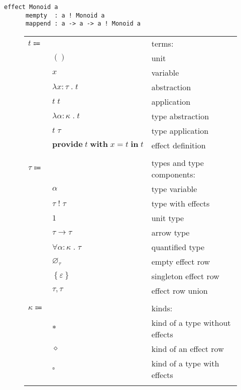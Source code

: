 \documentclass[12pt]{article}
\newcommand\anno[2]{#1 : #2}
\newcommand\term{t}
\newcommand\eunit{()}
\newcommand\evar{x}
\newcommand\eabs[2]{\lambda #1 \; . \; #2}
\newcommand\eapp[2]{#1 \; #2}
\newcommand\etabs[2]{\lambda #1 \; . \; #2}
\newcommand\etapp[2]{#1 \; #2}
\newcommand\eprovide[4]{\textbf{provide} \; #1 \; \textbf{with} \; #2 = #3 \; \textbf{in} \; #4}
\newcommand\type{\tau}
\newcommand\tvar{\alpha}
\newcommand\twitht[2]{#1 \; ! \; #2}
\newcommand\tunit{1}
\newcommand\tarrow[2]{#1 \rightarrow #2}
\newcommand\tforall[2]{\forall #1 \; . \; #2}
\newcommand\effect{\varepsilon}
\newcommand\rempty{\varnothing_{\type}}
\newcommand\rsingleton[1]{\left\{ #1 \right\}}
\newcommand\runion[2]{#1, #2}
\newcommand\kind{\kappa}
\newcommand\kpt{\ast}
\newcommand\krow{\diamond}
\newcommand\ktwitht{\square}
\begin{document}
  \begin{lstlisting}[gobble=4]
    effect Monoid a
      mempty  : a ! Monoid a
      mappend : a -> a -> a ! Monoid a
  \end{lstlisting}

  \begin{figure}
    \begin{mdframed}[backgroundcolor=none]
      \begin{center}
        \begin{tabular}{l l l}
          $\term \Coloneqq $ & & terms: \\
          & $\eunit$ & unit \\
          & $\evar$ & variable \\
          & $\eabs{\anno{\evar}{\type}}{\term}$ & abstraction \\
          & $\eapp{\term}{\term}$ & application \\
          & $\etabs{\anno{\tvar}{\kind}}{\term}$ & type abstraction \\
          & $\etapp{\term}{\type}$ & type application \\
          & $\eprovide{\term}{\evar}{\term}{\term}$ & effect definition \\
          \\
          $\type \Coloneqq$ & & types and type components: \\
          & $\tvar$ & type variable \\
          & $\twitht{\type}{\type}$ & type with effects \\
          & $\tunit$ & unit type \\
          & $\tarrow{\type}{\type}$ & arrow type \\
          & $\tforall{\anno{\tvar}{\kind}}{\type}$ & quantified type \\
          & $\rempty$ & empty effect row \\
          & $\rsingleton{\effect}$ & singleton effect row \\
          & $\runion{\type}{\type}$ & effect row union \\
          \\
          $\kind \Coloneqq$ & & kinds: \\
          & $\kpt$ & kind of a type without effects \\
          & $\krow$ & kind of an effect row \\
          & $\ktwitht$ & kind of a type with effects \\
          \\

\end{tabular}
\end{center}
\end{mdframed}
\end{figure}
\end{document}
